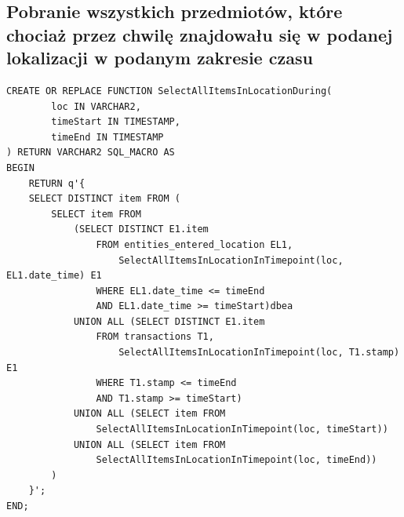 \documentclass[11pt]{article}
\numberwithin{figure}{subsection}
\begin{document}
	
	\subsection{Pobranie wszystkich przedmiotów, które chociaż przez chwilę
	znajdowału się w podanej lokalizacji w podanym zakresie czasu}
			
		\begin{lstlisting}[caption={Pobranie wszystkich przedmiotów, które
		chociaż przez chwilę znajdowału się w podanej lokalizacji w podanym
		zakresie czasu},captionpos=b]
CREATE OR REPLACE FUNCTION SelectAllItemsInLocationDuring(
		loc IN VARCHAR2,
		timeStart IN TIMESTAMP,
		timeEnd IN TIMESTAMP
) RETURN VARCHAR2 SQL_MACRO AS
BEGIN
 	RETURN q'{
	SELECT DISTINCT item FROM (
		SELECT item FROM
			(SELECT DISTINCT E1.item
				FROM entities_entered_location EL1,
					SelectAllItemsInLocationInTimepoint(loc, EL1.date_time) E1
				WHERE EL1.date_time <= timeEnd
				AND EL1.date_time >= timeStart)dbea
			UNION ALL (SELECT DISTINCT E1.item
				FROM transactions T1,
					SelectAllItemsInLocationInTimepoint(loc, T1.stamp) E1
				WHERE T1.stamp <= timeEnd
				AND T1.stamp >= timeStart)
			UNION ALL (SELECT item FROM
				SelectAllItemsInLocationInTimepoint(loc, timeStart))
			UNION ALL (SELECT item FROM
				SelectAllItemsInLocationInTimepoint(loc, timeEnd))
		)
 	}';
END;
		\end{lstlisting}
		
	
	\subsection{}
			
		\begin{lstlisting}[caption={},captionpos=b]
		\end{lstlisting}
		
	
	\subsection{}
			
		\begin{lstlisting}[caption={},captionpos=b]
		\end{lstlisting}
		
	
	\subsection{}
			
		\begin{lstlisting}[caption={},captionpos=b]
		\end{lstlisting}
		
\end{document}
